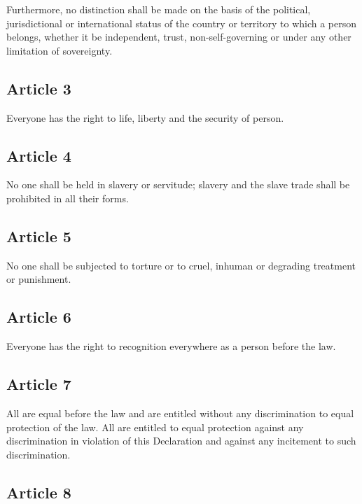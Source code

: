 \documentclass[
  titlepage,
  openright,
  DIV=calc,
  toc=listof,
  listof=nochaptergap]{scrbook}
\begin{document}
Furthermore, no distinction shall be made on the basis of the political,
jurisdictional or international status of the country or territory to
which a person belongs, whether it be independent, trust,
non-self-governing or under any other limitation of sovereignty.

\hypertarget{article-3}{%
\subsection{Article 3}\label{article-3}}

Everyone has the right to life, liberty and the security of person.

\hypertarget{article-4}{%
\subsection{Article 4}\label{article-4}}

No one shall be held in slavery or servitude; slavery and the slave
trade shall be prohibited in all their forms.

\hypertarget{article-5}{%
\subsection{Article 5}\label{article-5}}

No one shall be subjected to torture or to cruel, inhuman or degrading
treatment or punishment.

\hypertarget{article-6}{%
\subsection{Article 6}\label{article-6}}

Everyone has the right to recognition everywhere as a person before the
law.

\hypertarget{article-7}{%
\subsection{Article 7}\label{article-7}}

All are equal before the law and are entitled without any discrimination
to equal protection of the law. All are entitled to equal protection
against any discrimination in violation of this Declaration and against
any incitement to such discrimination.

\hypertarget{article-8}{%
\subsection{Article 8}\label{article-8}}
\end{document}
